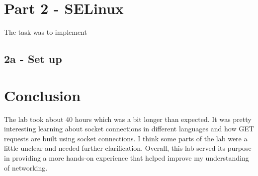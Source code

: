 \documentclass[11pt]{article}
\begin{document}
\section*{Part 2 - SELinux}
\label{sec:part-1}
The task was to implement
\subsection*{2a - Set up}

\section*{Conclusion}
\label{sec:conclusion}
The lab took about 40 hours which was a bit longer than expected.
It was pretty interesting learning about socket connections in different languages and how GET requests are built using socket connections.
I think some parts of the lab were a little unclear and needed further clarification.
Overall, this lab served its purpose in providing a more hands-on experience that helped improve my understanding of networking.

\nocite{*}


\end{document}

